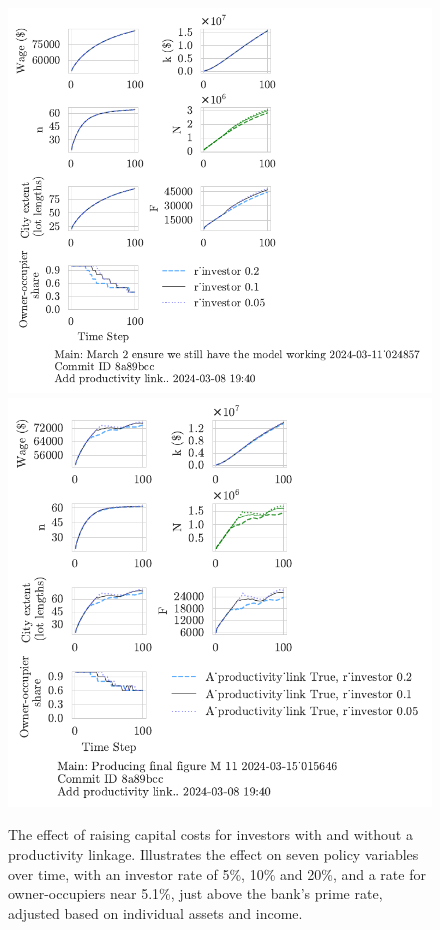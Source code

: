 \begin{figure}[h!tb] 
    \centering
    \includegraphics[scale=.75, trim={0 1.4cm 4cm 0},clip]{fig/r_investor-Main-024857.pdf} 
    \includegraphics[scale=.75, trim={0 1.4cm 3.5cm 0},clip]{fig/With-productivity_link-r_investor-15_015646.pdf} 
    \caption[The effect of raising capital costs for investors with and without a productivity linkage]{The effect of raising capital costs for investors with and without a productivity linkage. Illustrates the effect on seven policy variables over time, with an investor rate of 5\%, 10\% and 20\%, and a rate for owner-occupiers near 5.1\%, just above the bank's prime rate, adjusted based on individual assets and income.}
    \label{fig:Productivity_link_W-WO-Cost-of-capital}
\end{figure}

